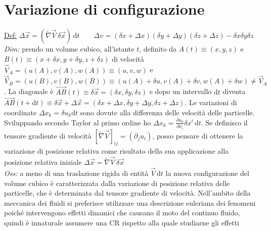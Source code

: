 \documentclass[11pt,a4paper]{report}
\newcommand{\de}{\mathrm d}
\begin{document}
	\section{Variazione di configurazione}
	\underline{Def:} $\Delta\vec x=(\utilde\nabla\vec V\,\delta\vec x)\,\de t\qquad \Delta\upsilon=(\delta x+\Delta x)(\delta y+\Delta y)(\delta z+\Delta z)-\delta x\delta y\delta z$\\
	\textit{Dim:} prendo un volume cubico, all'istante $t$, definito da $A(t)\equiv(x,y,z)$ e $B(t)\equiv(x\!+\!\delta x,y\!+\!\delta y,z\!+\!\delta z)$ di velocità $\vec V_A=(u(A),v(A),w(A))\equiv(u,v,w)$ e $\vec V_B=(u(B),v(B),w(B))\equiv(u(A)\!+\!\delta u,v(A)\!+\!\delta v,w(A)\!+\!\delta w)\neq\vec V_A$.
	La diagonale è $\overrightarrow{AB}(t)\equiv \delta \vec x=(\delta x,\delta y,\delta z)$ e dopo un intervallo $\de t$ diventa $\overrightarrow{AB}(t\!+\!\de t)\equiv\delta \vec x\!+\!\Delta\vec x=(\delta x\!+\!\Delta x,\delta y\!+\!\Delta y,\delta z\!+\!\Delta z)$. Le variazioni di coordinate $\Delta x_k=\delta u_k\de t$ sono dovute alla differenza delle velocità delle particelle. Sviluppando secondo Taylor al primo ordine ho $\Delta x_k=\frac{\partial u_k}{\partial x_i}\delta x^i\,\de t$. Se definisco il tensore gradiente di velocità $[\utilde\nabla\vec V]_{ij}=(\partial_ju_i)$, posso pensare di ottenere la variazione di posizione relativa come risultato della sua applicazione alla posizione relativa iniziale $\Delta \vec x=\utilde\nabla\vec V\,\delta\vec x$\\
	\textit{Oss:} a meno di una traslazione rigida di entità $\vec V\,\de t$ la nuova configurazione del volume cubico è caratterizzata dalla variazione di posizione relativa delle particelle, che è determinata dal tensore gradiente di velocità. Nell'ambito della meccanica dei fluidi si preferisce utilizzare una descrizione euleriana dei fenomeni poiché intervengono effetti dinamici che causano il moto del continuo fluido, quindi è innaturale assumere una CR rispetto alla quale studiarne gli effetti
	
\end{document}
